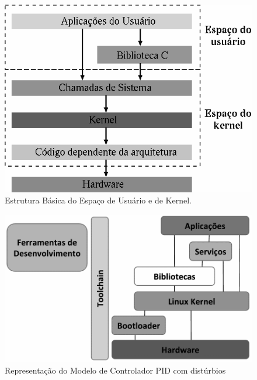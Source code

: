 \begin{figure}[htb]
  \caption{Estrutura Básica do Espaço de Usuário e de Kernel.}
  \begin{center}
      \includegraphics[scale=0.75]{img/kernel_user_space}
  \end{center}
  \label{fig:kernel_user_space}
\end{figure}


\begin{figure}[htb]
  \caption{Representação do Modelo de Controlador PID com distúrbios}
  \begin{center}
      \includegraphics[scale=0.35]{img/sistema-linux-overview_embarcados}
  \end{center}
  \label{fig:sistema-linux-overview_embarcados}
\end{figure}

